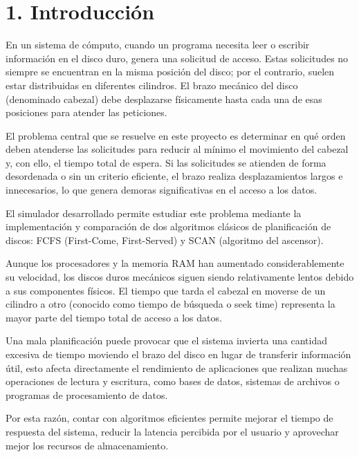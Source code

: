 \documentclass[14pt,letterpaper]{extarticle}
\begin{document}
\newpage
\setcounter{page}{2} %


\section*{1. Introducción}
En un sistema de cómputo, cuando un programa necesita leer o escribir información en el disco duro, genera una solicitud de acceso. Estas solicitudes no siempre se encuentran en la misma posición del disco; por el contrario, suelen estar distribuidas en diferentes cilindros. El brazo mecánico del disco (denominado cabezal) debe desplazarse físicamente hasta cada una de esas posiciones para atender las peticiones.

El problema central que se resuelve en este proyecto es determinar en qué orden deben atenderse las solicitudes para reducir al mínimo el movimiento del cabezal y, con ello, el tiempo total de espera. Si las solicitudes se atienden de forma desordenada o sin un criterio eficiente, el brazo realiza desplazamientos largos e innecesarios, lo que genera demoras significativas en el acceso a los datos.

El simulador desarrollado permite estudiar este problema mediante la implementación y comparación de dos algoritmos clásicos de planificación de discos: FCFS (First-Come, First-Served) y SCAN (algoritmo del ascensor).

Aunque los procesadores y la memoria RAM han aumentado considerablemente su velocidad, los discos duros mecánicos siguen siendo relativamente lentos debido a sus componentes físicos. El tiempo que tarda el cabezal en moverse de un cilindro a otro (conocido como tiempo de búsqueda o seek time) representa la mayor parte del tiempo total de acceso a los datos.

Una mala planificación puede provocar que el sistema invierta una cantidad excesiva de tiempo moviendo el brazo del disco en lugar de transferir información útil, esto afecta directamente el rendimiento de aplicaciones que realizan muchas operaciones de lectura y escritura, como bases de datos, sistemas de archivos o programas de procesamiento de datos.

Por esta razón, contar con algoritmos eficientes permite mejorar el tiempo de respuesta del sistema, reducir la latencia percibida por el usuario y aprovechar mejor los recursos de almacenamiento.
\end{document}

